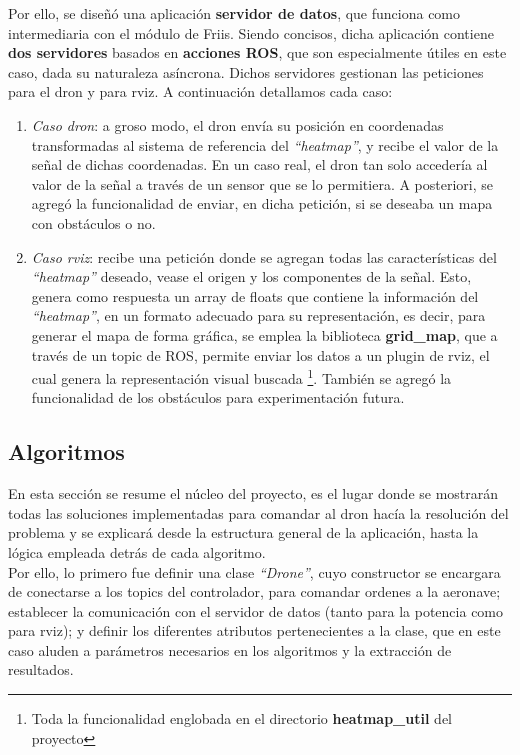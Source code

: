 Por ello, se diseñó una aplicación \textbf{servidor de datos}, que funciona como intermediaria con el módulo de Friis. Siendo concisos, dicha aplicación contiene \textbf{dos servidores} basados en \textbf{acciones \ac{ROS}}, que son especialmente útiles en este caso, dada su naturaleza asíncrona. Dichos servidores gestionan las peticiones para el dron y para rviz. A continuación detallamos cada caso:

\begin{enumerate}
	\item \emph{Caso dron}: a groso modo, el dron envía su posición en coordenadas transformadas al sistema de referencia del \emph{``heatmap''}, y recibe el valor de la señal de dichas coordenadas. En un caso real, el dron tan solo accedería al valor de la señal a través de un sensor que se lo permitiera. A posteriori, se agregó la funcionalidad de enviar, en dicha petición, si se deseaba un mapa con obstáculos o no.

	\item \emph{Caso rviz}: recibe una petición donde se agregan todas las características del \emph{``heatmap''} deseado, vease el origen y los componentes de la señal. Esto, genera como respuesta un array de floats que contiene la información del \emph{``heatmap''}, en un formato adecuado para su representación, es decir, para generar el mapa de forma gráfica, se emplea la biblioteca \textbf{grid\_map}, que a través de un topic de \ac{ROS}, permite enviar los datos a un plugin de rviz, el cual genera la representación visual buscada \footnote[2]{Toda la funcionalidad englobada en el directorio \textbf{heatmap\_util} del proyecto}. También se agregó la funcionalidad de los obstáculos para experimentación futura.
\end{enumerate}
\newpage
\subsection{Algoritmos}
\label{subsec:algoritmos}

En esta sección se resume el núcleo del proyecto, es el lugar donde se mostrarán todas las soluciones implementadas para comandar al dron hacía la resolución del problema y se explicará desde la estructura general de la aplicación, hasta la lógica empleada detrás de cada algoritmo.\\

Por ello, lo primero fue definir una clase \emph{``Drone''}, cuyo constructor se encargara de conectarse a los topics del controlador, para comandar ordenes a la aeronave; establecer la comunicación con el servidor de datos (tanto para la potencia como para rviz); y definir los diferentes atributos pertenecientes a la clase, que en este caso aluden a parámetros necesarios en los algoritmos y la extracción de resultados.\\

